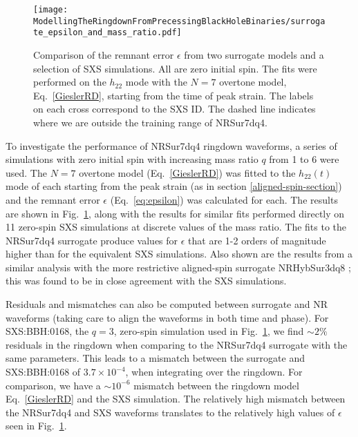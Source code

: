 \begin{figure}[b]
    \centering
    \texttt{[image: ModellingTheRingdownFromPrecessingBlackHoleBinaries/surrogate\_epsilon\_and\_mass\_ratio.pdf]}
    \caption[Comparison of the error on measured remnant mass and spin from two surrogate models and a selection of SXS simulations.]{
    Comparison of the remnant error $\epsilon$ from two surrogate models and a selection of SXS simulations. All are zero initial spin. The fits were performed on the $h_{22}$ mode with the $N=7$ overtone model, Eq.~\ref{GieslerRD}, starting from the time of peak strain. The labels on each cross correspond to the SXS ID. The dashed line indicates where we are outside the training range of NRSur7dq4.
    }
    \label{surrogate_epsilon_vs_q}
\end{figure} 

To investigate the performance of NRSur7dq4 ringdown waveforms, a series of simulations with zero initial spin with increasing mass ratio $q$ from 1 to 6 were used. 
The $N=7$ overtone model (Eq.~\ref{GieslerRD}) was fitted to the $h_{22}(t)$ mode of each starting from the peak strain (as in section \ref{aligned-spin-section})
and the remnant error $\epsilon$ (Eq.~\ref{eq:epsilon}) was calculated for each.
The results are shown in Fig.~\ref{surrogate_epsilon_vs_q}, along with the results for similar fits performed directly on 11 zero-spin SXS simulations at discrete values of the mass ratio. 
The fits to the NRSur7dq4 surrogate produce values for $\epsilon$ that are 1-2 orders of magnitude higher than for the equivalent SXS simulations. 
Also shown are the results from a similar analysis with the more restrictive aligned-spin surrogate NRHybSur3dq8 \cite{2019PhRvD..99f4045V}; this was found to be in close agreement with the SXS simulations.

Residuals and mismatches can also be computed between surrogate and NR waveforms (taking care to align the waveforms in both time and phase).
For SXS:BBH:0168, the $q=3$, zero-spin simulation used in Fig.~\ref{surrogate_epsilon_vs_q}, we find $\sim 2\%$ residuals in the ringdown when comparing to the NRSur7dq4 surrogate with the same parameters. 
This leads to a mismatch between the surrogate and SXS:BBH:0168 of $3.7 \times 10^{-4}$, when integrating over the ringdown. For comparison, we have a $\sim 10^{-6}$ mismatch between the ringdown model Eq.~\eqref{GieslerRD} and the SXS simulation. The relatively high mismatch between the NRSur7dq4 and SXS waveforms translates to the relatively high values of $\epsilon$ seen in Fig.~\ref{surrogate_epsilon_vs_q}. 

